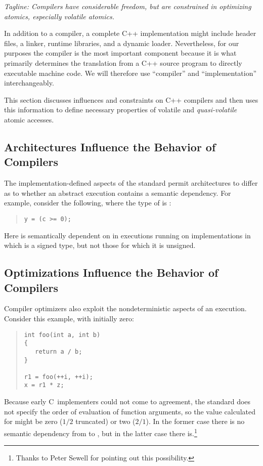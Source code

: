 \emph{Tagline: Compilers have considerable freedom, but are constrained
in optimizing atomics, especially volatile atomics.}

In addition to a compiler, a complete C++ implementation might include
 header files, a linker, runtime libraries, and a dynamic loader.
Nevertheless, for our purposes the compiler is the most important
component because it is what primarily determines the translation from
a C++ source program to directly executable machine code.
We will therefore use ``compiler'' and ``implementation'' interchangeably.

This section discusses influences and constraints on C++ compilers
and then uses this information to define necessary properties of
volatile and \emph{quasi-volatile} atomic accesses.

\subsection{Architectures Influence the Behavior of Compilers}
\label{sec:Architectures Influence the Behavior of Compilers}

The implementation-defined aspects of the standard permit architectures to
differ as to whether an abstract execution contains a semantic dependency.
For example, consider the following, where the type of  is :
\begin{quote}
\begin{verbatim}
y = (c >= 0);
\end{verbatim}
\end{quote}
Here  is semantically dependent on  in executions
running on implementations in
which  is a signed type,
but not those for which it is unsigned.

\subsection{Optimizations Influence the Behavior of Compilers}
\label{sec:Optimizations Influence the Behavior of Compilers}

Compiler optimizers also exploit the nondeterministic aspects of an
execution.
Consider this example, with  initially zero:
\begin{quote}
\begin{verbatim}
int foo(int a, int b)
{
   return a / b;
}

r1 = foo(++i, ++i);
x = r1 * z;
\end{verbatim}
\end{quote}
Because early C~implementers could not come to agreement, the standard
does not specify the order of evaluation of function arguments, so
the value calculated for  might be zero ($1/2$ truncated) or two
($2/1$).
In the former case there is no semantic dependency from  to ,
but in the latter case there is.\footnote{
	Thanks to Peter Sewell for pointing out this possibility.}

